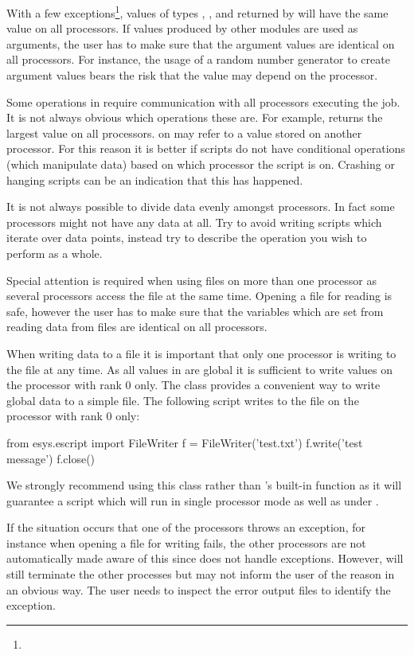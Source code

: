 With a few exceptions\footnote{}, values of
types , ,  and \numpy returned by \escript will
have the same value on all processors.
If values produced by other modules are used as arguments, the user has to
make sure that the argument values are identical on all processors.
For instance, the usage of a random number generator to create argument values
bears the risk that the value may depend on the processor. 

Some operations in \escript require communication with all processors
executing the job. It is not always obvious which operations these are.
For example,  returns the largest value on all processors.
 on  may refer to a value stored on another processor.
For this reason it is better if scripts do not have conditional operations
(which manipulate data) based on which processor the script is on.
Crashing or hanging scripts can be an indication that this has happened.

It is not always possible to divide data evenly amongst processors.
In fact some processors might not have any data at all.
Try to avoid writing scripts which iterate over data points, instead try to
describe the operation you wish to perform as a whole.

Special attention is required when using files on more than one processor as
several processors access the file at the same time. Opening a file for
reading is safe, however the user has to make sure that the variables which
are set from reading data from files are identical on all processors.

When writing data to a file it is important that only one processor is writing
to the file at any time. As all values in \escript are global it is sufficient
to write values on the processor with \MPI rank $0$ only.
The  class provides a convenient way to write global data
to a simple file.  The following script writes to the file  on
the processor with rank 0 only:
\begin{python}
  from esys.escript import FileWriter
  f = FileWriter('test.txt')
  f.write('test message')
  f.close()
\end{python}
We strongly recommend using this class rather than \PYTHON's built-in 
function as it will guarantee a script which will run in single processor mode
as well as under \MPI.

If the situation occurs that one of the processors throws an exception, for
instance when opening a file for writing fails, the other processors are not
automatically made aware of this since \MPI does not handle exceptions.
However, \MPI will still terminate the other processes but may not inform the
user of the reason in an obvious way.
The user needs to inspect the error output files to identify the exception.


